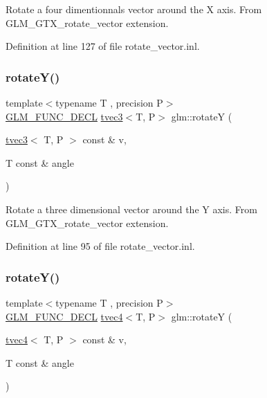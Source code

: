 Rotate a four dimentionnals vector around the X axis. From G\+L\+M\+\_\+\+G\+T\+X\+\_\+rotate\+\_\+vector extension. 

Definition at line 127 of file rotate\+\_\+vector.\+inl.

\mbox{\label{group__gtx__rotate__vector_gabb5d19eba5befeebcb35a0aad4a114e3}} 
\subsubsection{\texorpdfstring{rotateY()}{rotateY()}\hspace{0.1cm}{\footnotesize\ttfamily [1/2]}}
{\footnotesize\ttfamily template$<$typename T , precision P$>$ \\
\mbox{\hyperlink{setup_8hpp_ab2d052de21a70539923e9bcbf6e83a51}{G\+L\+M\+\_\+\+F\+U\+N\+C\+\_\+\+D\+E\+CL}} \mbox{\hyperlink{structglm_1_1tvec3}{tvec3}}$<$T, P$>$ glm\+::rotateY (\begin{DoxyParamCaption}\item[{\mbox{\hyperlink{structglm_1_1tvec3}{tvec3}}$<$ T, P $>$ const \&}]{v,  }\item[{T const \&}]{angle }\end{DoxyParamCaption})}

Rotate a three dimensional vector around the Y axis. From G\+L\+M\+\_\+\+G\+T\+X\+\_\+rotate\+\_\+vector extension. 

Definition at line 95 of file rotate\+\_\+vector.\+inl.

\mbox{\label{group__gtx__rotate__vector_gae2507577c4bffa3548b32852791dd90c}} 
\subsubsection{\texorpdfstring{rotateY()}{rotateY()}\hspace{0.1cm}{\footnotesize\ttfamily [2/2]}}
{\footnotesize\ttfamily template$<$typename T , precision P$>$ \\
\mbox{\hyperlink{setup_8hpp_ab2d052de21a70539923e9bcbf6e83a51}{G\+L\+M\+\_\+\+F\+U\+N\+C\+\_\+\+D\+E\+CL}} \mbox{\hyperlink{structglm_1_1tvec4}{tvec4}}$<$T, P$>$ glm\+::rotateY (\begin{DoxyParamCaption}\item[{\mbox{\hyperlink{structglm_1_1tvec4}{tvec4}}$<$ T, P $>$ const \&}]{v,  }\item[{T const \&}]{angle }\end{DoxyParamCaption})}

